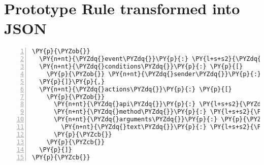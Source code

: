 \section{Prototype Rule transformed into JSON}
\label{lst:PrototypeRuleInJSONw}
\begin{Verbatim}[frame=single,fontsize=\footnotesize,commandchars=\\\{\},numbers=left,firstnumber=1,stepnumber=1,xleftmargin
=.3in]
\PY{p}{\PYZob{}}
  \PY{n+nt}{\PYZdq{}event\PYZdq{}}\PY{p}{:} \PY{l+s+s2}{\PYZdq{}mail\PYZdq{}}\PY{p}{,}
  \PY{n+nt}{\PYZdq{}conditions\PYZdq{}}\PY{p}{:} \PY{p}{[}
    \PY{p}{\PYZob{}} \PY{n+nt}{\PYZdq{}sender\PYZdq{}}\PY{p}{:} \PY{l+s+s2}{\PYZdq{}sender@mail.com\PYZdq{} }\PY{p}{\PYZcb{}}\PY{p}{,}
  \PY{p}{]}\PY{p}{,}
  \PY{n+nt}{\PYZdq{}actions\PYZdq{}}\PY{p}{:} \PY{p}{[}
    \PY{p}{\PYZob{}}
      \PY{n+nt}{\PYZdq{}api\PYZdq{}}\PY{p}{:} \PY{l+s+s2}{\PYZdq{}webapi\PYZdq{}}\PY{p}{,}
      \PY{n+nt}{\PYZdq{}method\PYZdq{}}\PY{p}{:} \PY{l+s+s2}{\PYZdq{}newcontent\PYZdq{}}\PY{p}{,}
      \PY{n+nt}{\PYZdq{}arguments\PYZdq{}}\PY{p}{:} \PY{p}{\PYZob{}}
        \PY{n+nt}{\PYZdq{}text\PYZdq{}}\PY{p}{:} \PY{l+s+s2}{\PYZdq{}\PYZdl{}X.subject\PYZdq{}}
      \PY{p}{\PYZcb{}}
    \PY{p}{\PYZcb{}}
  \PY{p}{]}
\PY{p}{\PYZcb{}}
\end{Verbatim}




